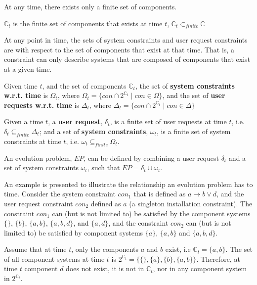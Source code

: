 At any time, there exists only a finite set of components. 
\begin{defs}
$\mathbb{C}_{t}$ is the finite set of components that exists at time $t$, $\mathbb{C}_{t} \subset_{finite} \mathbb{C}$
\end{defs}

At any point in time, the sets of system constraints and user request constraints are with respect to the set of components that exist at that time.
That is, a constraint can only describe systems that are composed of components that exist at a given time. 
\begin{defs}
Given time $t$, and the set of components $\mathbb{C}_{t}$, the set of \textbf{system constraints w.r.t. time} is $\Omega_{t}$, where $\Omega_{t} = \{con \cap 2^{\mathbb{C}_{t}} \mid con \in \Omega\}$,
and the set of \textbf{user requests w.r.t. time} is $\Delta_{t}$, where $\Delta_{t} = \{con \cap 2^{\mathbb{C}_{t}} \mid con \in \Delta\}$
\end{defs}

\begin{defs}
Given a time $t$, a \textbf{user request}, $\delta_{t}$, is a finite set of user requests at time $t$, i.e. $\delta_{t} \subseteq_{finite} \Delta_{t}$;
and a set of \textbf{system constraints}, $\omega_{t}$, is a finite set of system constraints at time $t$, i.e. $\omega_{t} \subseteq_{finite} \Omega_{t}$.  
\end{defs}

An evolution problem, $EP$, can be defined by combining a user request $\delta_{t}$ and a set of system constraints $\omega_{t}$, such that $EP = \delta_{t} \cup \omega_{t}$.

An example is presented to illustrate the relationship an evolution problem has to time.
Consider the system constraint $con_1$ that is defined as $a \rightarrow b \vee d$, and the user request constraint $con_2$ defined as $a$ (a singleton installation constraint).
The constraint $con_1$ can (but is not limited to) be satisfied by the component systems $\{\}$, $\{b\}$, $\{a,b\}$, $\{a,b,d\}$, and $\{a,d\}$,
and the constraint $con_2$ can (but is not limited to) be satisfied by component systems $\{a\}$, $\{a,b\}$ and $\{a,b,d\}$.

Assume that at time $t$, only the components $a$ and $b$ exist, i.e $\mathbb{C}_{t} = \{a,b\}$.
The set of all component systems at time $t$ is $2^{\mathbb{C}_{t}} = \{\{\},\{a\},\{b\},\{a,b\}\}$.
Therefore, at time $t$ component $d$ does not exist, it is not in $\mathbb{C}_{t}$, nor in any component system in $2^{\mathbb{C}_{t}}$.

